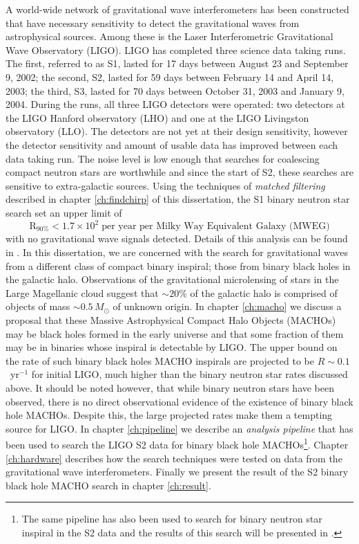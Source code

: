 A world-wide network of gravitational wave interferometers has been
constructed that have necessary sensitivity to detect the gravitational
waves from astrophysical sources. Among these is the Laser Interferometric
Gravitational Wave Observatory (LIGO)\cite{Barish:1999}. LIGO has completed
three science data taking runs. The first, referred to as S1, lasted for 17
days between August 23 and September 9, 2002; the second, S2, lasted for 59
days between February 14 and April 14, 2003; the third, S3, lasted for 70 days
between October 31, 2003 and January 9, 2004.  During the runs, all three LIGO
detectors were operated: two detectors at the LIGO Hanford observatory (LHO)
and one at the LIGO Livingston observatory (LLO).  The detectors are not yet
at their design sensitivity, however the detector sensitivity and amount of
usable data has improved between each data taking run. The noise level is low
enough that searches for coalescing compact neutron stars are worthwhile and
since the start of S2, these searches are sensitive to extra-galactic sources.
Using the techniques of \emph{matched filtering} described in chapter
\ref{ch:findchirp} of this dissertation, the S1 binary neutron star search set
an upper limit of
\begin{equation}
\mathrm{R}_{90\%} < 1.7 \times 10^2 \;\textrm{per year per Milky Way Equivalent Galaxy (MWEG)}
\end{equation}
with no gravitational wave signals detected. Details of this analysis can be
found in \cite{LIGOS1iul}. In this dissertation, we are concerned with the
search for gravitational waves from a different class of compact binary
inspiral; those from binary black holes in the galactic halo. Observations of
the gravitational microlensing of stars in the Large Magellanic cloud suggest
that $\sim 20\%$ of the galactic halo is comprised of objects of mass $\sim
0.5\,M_\odot$ of unknown origin. In chapter \ref{ch:macho} we discuss a
proposal that these Massive Astrophysical Compact Halo Objects (MACHOs) may be
black holes formed in the early universe and that some fraction of them may be
in binaries whose inspiral is detectable by LIGO\cite{Nakamura:1997sm}.  The
upper bound on the rate of such binary black holes MACHO inspirals are
projected to be $R \sim 0.1$~yr$^{-1}$ for initial LIGO, much higher than the
binary neutron star rates discussed above. It should be noted however, that
while binary neutron stars have been observed, there is no direct
observational evidence of the existence of binary black hole MACHOs. Despite
this, the large projected rates make them a tempting source for LIGO. In
chapter \ref{ch:pipeline} we describe an \emph{analysis pipeline} that has
been used to search the LIGO S2 data for binary black hole MACHOs\footnote{The
same pipeline has also been used to search for binary neutron star inspiral in
the S2 data and the results of this search will be presented in
\cite{LIGOS2iul}.}. Chapter \ref{ch:hardware} describes how the search
techniques were tested on data from the gravitational wave interferometers.
Finally we present the result of the S2 binary black hole MACHO search in
chapter \ref{ch:result}. 
